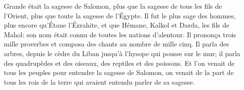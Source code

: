 Grande était la sagesse de Salomon, plus que la sagesse de tous les fils de l’Orient,
	plus que toute la sagesse de l’Égypte.
Il fut le plus sage des hommes, plus encore qu’Étane l’Ézrahite,
	et que Hémane, Kalkol et Darda, les fils de Mahol:
	son nom était connu de toutes les nations d’alentour.
Il prononça trois mille proverbes et composa des chants au nombre de mille cinq.
Il parla des arbres, depuis le cèdre du Liban jusqu’à l’hysope qui pousse sur le mur;
	il parla des quadrupèdes et des oiseaux, des reptiles et des poissons.
Et l’on venait de tous les peuples pour entendre la sagesse de Salomon,
	on venait de la part de tous les rois de la terre
		qui avaient entendu parler de sa sagesse.
